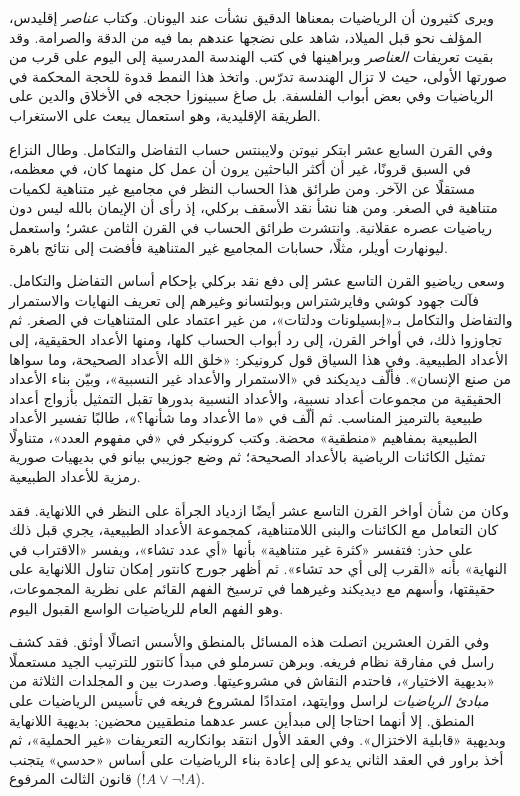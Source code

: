 \documentclass[../../../include/open-logic-section]{subfiles}
\begin{document}
ويرى كثيرون أن الرياضيات بمعناها الدقيق نشأت عند اليونان.
وكتاب \emph{عناصر} إقليدس، المؤلف نحو  قبل الميلاد،
شاهد على نضجها عندهم بما فيه من الدقة والصرامة. وقد بقيت
تعريفات \emph{العناصر} وبراهينها في كتب الهندسة المدرسية
إلى اليوم على قرب من صورتها الأولى، حيث لا تزال الهندسة
تدرّس. واتخذ هذا النمط قدوة للحجة المحكمة في الرياضيات وفي
بعض أبواب الفلسفة. بل صاغ سبينوزا حججه في الأخلاق والدين
على الطريقة الإقليدية، وهو استعمال يبعث على الاستغراب.

وفي القرن السابع عشر ابتكر نيوتن ولايبنتس حساب التفاضل
والتكامل. وطال النزاع في السبق قرونًا، غير أن أكثر الباحثين
يرون أن عمل كل منهما كان، في معظمه، مستقلًا عن الآخر.
ومن طرائق هذا الحساب النظر في مجاميع غير متناهية لكميات
متناهية في الصغر. ومن هنا نشأ نقد الأسقف بركلي، إذ رأى
أن الإيمان بالله ليس دون رياضيات عصره عقلانية. وانتشرت
طرائق الحساب في القرن الثامن عشر؛ واستعمل ليونهارت أويلر،
مثلًا، حسابات المجاميع غير المتناهية فأفضت إلى نتائج باهرة.

وسعى رياضيو القرن التاسع عشر إلى دفع نقد بركلي بإحكام
أساس التفاضل والتكامل. فآلت جهود كوشي وفايرشتراس وبولتسانو
وغيرهم إلى تعريف النهايات والاستمرار والتفاضل والتكامل
بـ«إبسيلونات ودلتات»، من غير اعتماد على المتناهيات في الصغر.
ثم تجاوزوا ذلك، في أواخر القرن، إلى رد أبواب الحساب كلها،
ومنها الأعداد الحقيقية، إلى الأعداد الطبيعية. وفي هذا السياق
قول كرونيكر: «خلق الله الأعداد الصحيحة، وما سواها من صنع الإنسان».
فألّف ديديكند في  «الاستمرار والأعداد غير النسبية»،
وبيّن بناء الأعداد الحقيقية من مجموعات أعداد نسبية، والأعداد
النسبية بدورها تقبل التمثيل بأزواج أعداد طبيعية بالترميز
المناسب. ثم ألّف في  «ما الأعداد وما شأنها؟»، طالبًا
تفسير الأعداد الطبيعية بمفاهيم «منطقية» محضة. وكتب كرونيكر
في  «في مفهوم العدد»، متناولًا تمثيل الكائنات الرياضية
بالأعداد الصحيحة؛ ثم وضع جوزيبي بيانو في  بديهيات
صورية رمزية للأعداد الطبيعية.

وكان من شأن أواخر القرن التاسع عشر أيضًا ازدياد الجرأة على
النظر في اللانهاية. فقد كان التعامل مع الكائنات والبنى
اللامتناهية، كمجموعة الأعداد الطبيعية، يجري قبل ذلك على حذر:
فتفسر «كثرة غير متناهية» بأنها «أي عدد تشاء»، ويفسر
«الاقتراب في النهاية» بأنه «القرب إلى أي حد تشاء». ثم أظهر
جورج كانتور إمكان تناول اللانهاية على حقيقتها، وأسهم مع
ديديكند وغيرهما في ترسيخ الفهم القائم على نظرية المجموعات،
وهو الفهم العام للرياضيات الواسع القبول اليوم.

وفي القرن العشرين اتصلت هذه المسائل بالمنطق والأسس اتصالًا
أوثق. فقد كشف راسل في  مفارقة نظام فريغه. وبرهن تسرملو
في  مبدأ كانتور للترتيب الجيد مستعملًا «بديهية الاختيار»،
فاحتدم النقاش في مشروعيتها. وصدرت بين  و المجلدات
الثلاثة من \emph{مبادئ الرياضيات} لراسل ووايتهد، امتدادًا
لمشروع فريغه في تأسيس الرياضيات على المنطق. إلا أنهما
احتاجا إلى مبدأين عسر عدهما منطقيين محضين: بديهية اللانهاية
وبديهية «قابلية الاختزال». وفي العقد الأول انتقد بوانكاريه
التعريفات «غير الحملية»، ثم أخذ براور في العقد الثاني يدعو
إلى إعادة بناء الرياضيات على أساس «حدسي» يتجنب قانون
الثالث المرفوع ($!A\lor\lnot !A$).
\end{document}
